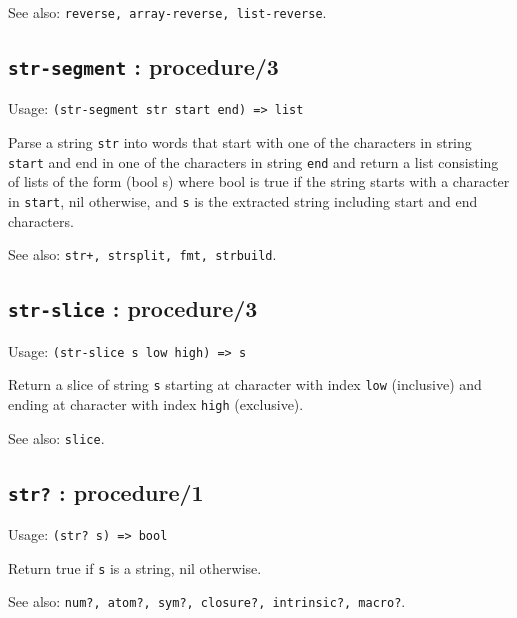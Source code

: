 \documentclass[
]{article}
\newcommand{\passthrough}[1]{#1}
\begin{document}
See also:
\passthrough{\lstinline!reverse, array-reverse, list-reverse!}.

\hypertarget{str-segment-procedure3-1}{%
\subsection{\texorpdfstring{\texttt{str-segment} :
procedure/3}{str-segment : procedure/3}}\label{str-segment-procedure3-1}}

Usage: \passthrough{\lstinline!(str-segment str start end) => list!}

Parse a string \passthrough{\lstinline!str!} into words that start with
one of the characters in string \passthrough{\lstinline!start!} and end
in one of the characters in string \passthrough{\lstinline!end!} and
return a list consisting of lists of the form (bool s) where bool is
true if the string starts with a character in
\passthrough{\lstinline!start!}, nil otherwise, and
\passthrough{\lstinline!s!} is the extracted string including start and
end characters.

See also: \passthrough{\lstinline!str+, strsplit, fmt, strbuild!}.

\hypertarget{str-slice-procedure3-1}{%
\subsection{\texorpdfstring{\texttt{str-slice} :
procedure/3}{str-slice : procedure/3}}\label{str-slice-procedure3-1}}

Usage: \passthrough{\lstinline!(str-slice s low high) => s!}

Return a slice of string \passthrough{\lstinline!s!} starting at
character with index \passthrough{\lstinline!low!} (inclusive) and
ending at character with index \passthrough{\lstinline!high!}
(exclusive).

See also: \passthrough{\lstinline!slice!}.

\hypertarget{str-procedure1}{%
\subsection{\texorpdfstring{\texttt{str?} :
procedure/1}{str? : procedure/1}}\label{str-procedure1}}

Usage: \passthrough{\lstinline!(str? s) => bool!}

Return true if \passthrough{\lstinline!s!} is a string, nil otherwise.

See also:
\passthrough{\lstinline!num?, atom?, sym?, closure?, intrinsic?, macro?!}.
\end{document}
